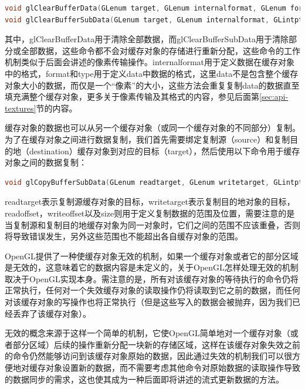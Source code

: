 \begin{lstlisting}[language=C++]
void glClearBufferData​(GLenum target​​, GLenum internalformat​, GLenum format​, GLenum type​, const void * data​);
void glClearBufferSubData​(GLenum target​, GLenum internalformat​, GLintptr offset​, GLsizeiptr size​, GLenum format​, GLenum type​, const void * data​);
\end{lstlisting}

其中，glClearBufferData用于清除全部数据，而glClearBufferSubData用于清除部分或全部数据，这些命令都不会对缓存对象的存储进行重新分配，这些命令的工作机制类似于后面会讲述的像素传输操作。internalformat用于定义数据在缓存对象中的格式，format和type用于定义data中数据的格式，这里data不是包含整个缓存对象大小的数据，而仅是一个“像素”的大小，这些方法会重复复制data的数据直至填充满整个缓存对象，更多关于像素传输及其格式的内容，参见后面第\ref{sec:api-textures}节的内容。
 
缓存对象的数据也可以从另一个缓存对象（或同一个缓存对象的不同部分）复制。为了在缓存对象之间进行数据复制，我们首先需要绑定复制源（source）和复制目的地（destination）缓存对象到对应的目标（target），然后使用以下命令用于缓存对象之间的数据复制：

\begin{lstlisting}[language=C++]
void glCopyBufferSubData​(GLenum readtarget​, GLenum writetarget​, GLintptr readoffset​, GLintptr writeoffset​, GLsizeiptr size​);
\end{lstlisting}

readtarget表示复制源缓存对象的目标，writetarget表示复制目的地对象的目标，readoffset，writeoffset以及size则用于定义复制数据的范围及位置，需要注意的是当复制源和复制目的地缓存对象为同一对象时，它们之间的范围不应该重叠，否则将导致错误发生，另外这些范围也不能超出各自缓存对象的范围。

OpenGL提供了一种使缓存对象无效的机制，如果一个缓存对象或者它的部分区域是无效的，这意味着它的数据内容是未定义的，关于OpenGL怎样处理无效的机制取决于OpenGL实现本身。需注意的是，所有对该缓存对象的等待执行的命令仍将正常执行，任何对一个失效缓存对象的读取操作仍将读取到它之前的数据，而任何对该缓存对象的写操作也将正常执行（但是这些写入的数据会被抛弃，因为我们已经丢弃了该缓存对象）。

无效的概念来源于这样一个简单的机制，它使OpenGL简单地对一个缓存对象（或者部分区域）后续的操作重新分配一块新的存储区域，这样在该缓存对象失效之前的命令仍然能够访问到该缓存对象原始的数据，因此通过失效的机制我们可以很方便地对缓存对象设置新的数据，而不需要考虑其他命令对原始数据的读取操作导致的数据同步的需求，这也使其成为一种后面即将讲述的流式更新数据的方法。

